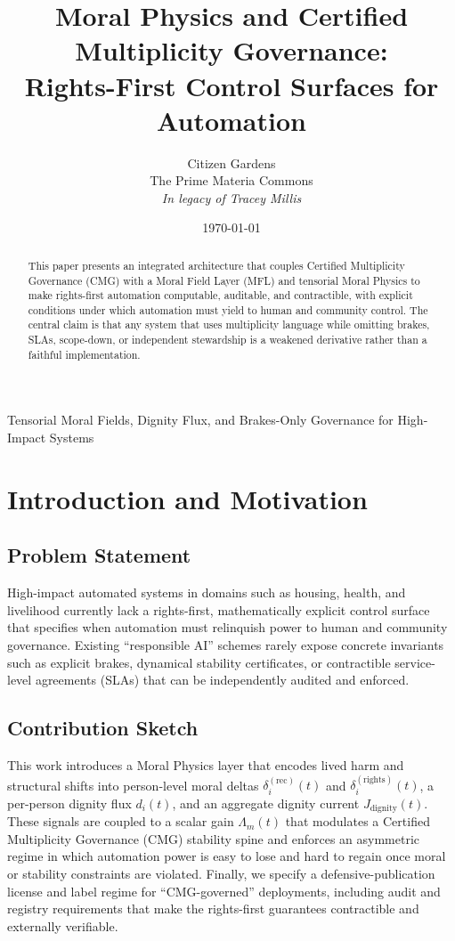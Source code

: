 \documentclass[11pt]{article}
\title{Moral Physics and Certified Multiplicity Governance:\\
Rights-First Control Surfaces for Automation}
\author{Citizen Gardens \\ The Prime Materia Commons \\ \textit{In legacy of Tracey Millis}}
\date{\today}
\begin{document}
\maketitle

\begin{center}
  \large
  Tensorial Moral Fields, Dignity Flux, and Brakes-Only Governance for High-Impact Systems
\end{center}

\vspace{1.5em}

\begin{abstract}
This paper presents an integrated architecture that couples Certified Multiplicity Governance (CMG) with a Moral Field Layer (MFL) and tensorial Moral Physics to make rights-first automation computable, auditable, and contractible, with explicit conditions under which automation must yield to human and community control. The central claim is that any system that uses multiplicity language while omitting brakes, SLAs, scope-down, or independent stewardship is a weakened derivative rather than a faithful implementation.
\end{abstract}

\newpage
\tableofcontents


\section{Introduction and Motivation}

\subsection{Problem Statement}

High-impact automated systems in domains such as housing, health, and livelihood currently lack a rights-first, mathematically explicit control surface that specifies when automation must relinquish power to human and community governance. Existing ``responsible AI'' schemes rarely expose concrete invariants such as explicit brakes, dynamical stability certificates, or contractible service-level agreements (SLAs) that can be independently audited and enforced.

\subsection{Contribution Sketch}

This work introduces a Moral Physics layer that encodes lived harm and structural shifts into person-level moral deltas
\(\delta_i^{(\mathrm{rec})}(t)\) and \(\delta_i^{(\mathrm{rights})}(t)\), a per-person dignity flux \(d_i(t)\), and an aggregate dignity current \(J_{\mathrm{dignity}}(t)\). These signals are coupled to a scalar gain \(\Lambda_m(t)\) that modulates a Certified Multiplicity Governance (CMG) stability spine and enforces an asymmetric regime in which automation power is easy to lose and hard to regain once moral or stability constraints are violated. Finally, we specify a defensive-publication license and label regime for ``CMG-governed'' deployments, including audit and registry requirements that make the rights-first guarantees contractible and externally verifiable.
\end{document}

